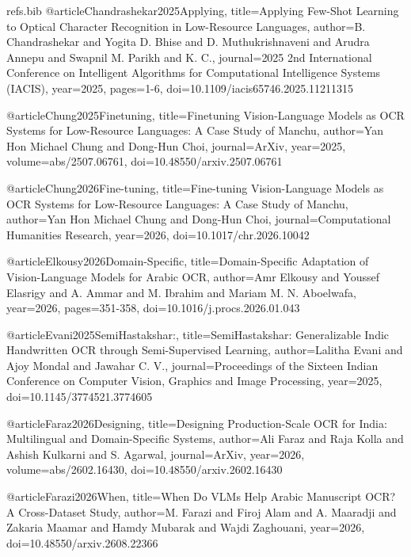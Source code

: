 \begin{filecontents}{refs.bib}
    @article{Chandrashekar2025Applying,
    title={Applying Few-Shot Learning to Optical Character Recognition in Low-Resource Languages},
    author={B. Chandrashekar and Yogita D. Bhise and D. Muthukrishnaveni and Arudra Annepu and Swapnil M. Parikh and K. C.},
    journal={2025 2nd International Conference on Intelligent Algorithms for Computational Intelligence Systems (IACIS)},
    year={2025},
    pages={1-6},
    doi={10.1109/iacis65746.2025.11211315}
    }
    
    @article{Chung2025Finetuning,
    title={Finetuning Vision-Language Models as OCR Systems for Low-Resource Languages: A Case Study of Manchu},
    author={Yan Hon Michael Chung and Dong-Hun Choi},
    journal={ArXiv},
    year={2025},
    volume={abs/2507.06761},
    doi={10.48550/arxiv.2507.06761}
    }
    
    @article{Chung2026Fine-tuning,
    title={Fine-tuning Vision-Language Models as OCR Systems for Low-Resource Languages: A Case Study of Manchu},
    author={Yan Hon Michael Chung and Dong-Hun Choi},
    journal={Computational Humanities Research},
    year={2026},
    doi={10.1017/chr.2026.10042}
    }
    
    @article{Elkousy2026Domain-Specific,
    title={Domain-Specific Adaptation of Vision-Language Models for Arabic OCR},
    author={Amr Elkousy and Youssef Elasrigy and A. Ammar and M. Ibrahim and Mariam M. N. Aboelwafa},
    year={2026},
    pages={351-358},
    doi={10.1016/j.procs.2026.01.043}
    }
    
    @article{Evani2025SemiHastakshar:,
    title={SemiHastakshar: Generalizable Indic Handwritten OCR through Semi-Supervised Learning},
    author={Lalitha Evani and Ajoy Mondal and Jawahar C. V.},
    journal={Proceedings of the Sixteen Indian Conference on Computer Vision, Graphics and Image Processing},
    year={2025},
    doi={10.1145/3774521.3774605}
    }
    
    @article{Faraz2026Designing,
    title={Designing Production-Scale OCR for India: Multilingual and Domain-Specific Systems},
    author={Ali Faraz and Raja Kolla and Ashish Kulkarni and S. Agarwal},
    journal={ArXiv},
    year={2026},
    volume={abs/2602.16430},
    doi={10.48550/arxiv.2602.16430}
    }
    
    @article{Farazi2026When,
    title={When Do VLMs Help Arabic Manuscript OCR? A Cross-Dataset Study},
    author={M. Farazi and Firoj Alam and A. Maaradji and Zakaria Maamar and Hamdy Mubarak and Wajdi Zaghouani},
    year={2026},
    doi={10.48550/arxiv.2608.22366}
    }
    

\end{filecontents}
